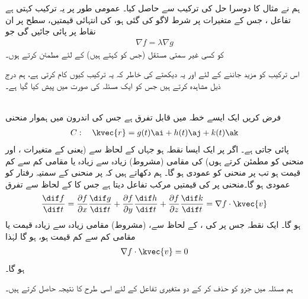 ہم نے مثال  کا دوسرا حل   
 کی ترکیب سے حاصل کیا۔  عمومی طور پر یہ ترکیب کہتی  ہے  تفاعل ،    جس کے متغیرات پر  شرط  لاگو کی گئی ہو،   کی انتہائی قیمتیں،  سطح  پر  ان  نقاط پر پائی جائیں گی جو 
\begin{align*}
\nabla f=\lambda \nabla g
\end{align*}
کو کسی غیر سمتی مستقل  (جس کو  کہتے ہیں)  کے لئے مطمئن کرتے ہوں۔

اس ترکیب  کو مزید جاننے کے لئے  اور یہ  دیکھتے  کی خاطر  کہ  یہ ترکیب کیوں کام کرتی ہے، ہم درج ذیل  مشاہدہ کرتے ہیں جس کو ایک مسئلہ کی صورت میں پیش کیا گیا ہے۔

\\
 فرض کریں    ایک ایسے خطہ میں قابل تفرق ہے جس کی اندرون میں ہموار منحنی
\begin{align*}
C:\quad \kvec{r}=g(t)\ai+h(t)\aj+k(t)\ak
\end{align*}
پائی جاتی ہے۔ اگر  پر  ایک ایسا  نقطہ ہو جہاں  کے لحاظ سے  (یعنی  کے متغیرات ،  اور  منحنی   کو مطمئن کرتے ہوں)       کی  مقامی  (مشروط)    زیادہ سے زیادہ یا مقامی کم سے کم قیمت ہو تب  پر  منحنی  کو عمودی ہو گا۔ 
ہم دکھاتے ہیں کہ  پر منحنی  کے  سمتیہ رفتار کو  عمودی ہو گا۔منحنی  پر  کی قیمتیں  مرکب تفاعل   دیتا ہے جس کا  کے لحاظ سے تفرق
\begin{align*}
\frac{\dif f}{\dif t}=\frac{\partial f}{\partial x}\frac{\dif g}{\dif t}+\frac{\partial f}{\partial y}\frac{\dif h}{\dif t}+\frac{\partial f}{\partial z}\frac{\dif k}{\dif t}=\nabla f\cdot \kvec{v}
\end{align*}
ہو گا۔  ایک نقطہ  جس پر   کی  ،    کے لحاظ  سے،   (مشروط)   مقامی زیادہ سے زیادہ قیمت یا مقامی کم سے کم قیمت ہو،  ہو گا    لہٰذا
\begin{align*}
\nabla f\cdot \kvec{v}=0
\end{align*}
ہو گا۔

ہم مسئلہ  میں جزو  کو حذف  کر کے دو متغیری  تفاعل  کے لئے اسی طرح کا نتیجہ حاصل کرتے ہیں۔

